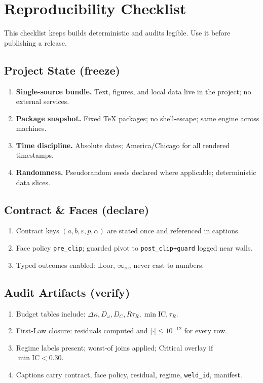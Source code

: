 \chapter{Reproducibility Checklist}
\label{apx:repro}

This checklist keeps builds deterministic and audits legible. Use it before publishing a release.

\section{Project State (freeze)}
\label{sec:repro-freeze}

\begin{enumerate}[leftmargin=1.25em]
  \item \textbf{Single-source bundle.} Text, figures, and local data live in the project; no external services.
  \item \textbf{Package snapshot.} Fixed TeX packages; no shell-escape; same engine across machines.
  \item \textbf{Time discipline.} Absolute dates; America/Chicago for all rendered timestamps.
  \item \textbf{Randomness.} Pseudorandom seeds declared where applicable; deterministic data slices.
\end{enumerate}

\section{Contract \& Faces (declare)}
\label{sec:repro-contract}

\begin{enumerate}[leftmargin=1.25em]
  \item Contract keys \((a,b,\varepsilon,p,\alpha)\) are stated once and referenced in captions.
  \item Face policy \texttt{pre\_clip}; guarded pivot to \texttt{post\_clip+guard} logged near walls.
  \item Typed outcomes enabled: \(\bot\!\mathrm{oor}\), \(\infty_{\mathrm{rec}}\) never cast to numbers.
\end{enumerate}

\section{Audit Artifacts (verify)}
\label{sec:repro-audits}

\begin{enumerate}[leftmargin=1.25em]
  \item Budget tables include: \(\Delta\kappa, D_{\omega}, D_{C}, R\tau_{R}, \min\mathrm{IC}, \tau_{R}\).
  \item First-Law closure: residuals computed and \(|\cdot|\le 10^{-12}\) for every row.
  \item Regime labels present; worst-of joins applied; Critical overlay if \(\min\mathrm{IC}<0.30\).
  \item Captions carry contract, face policy, residual, regime, \texttt{weld\_id}, manifest.
\end{enumerate}

